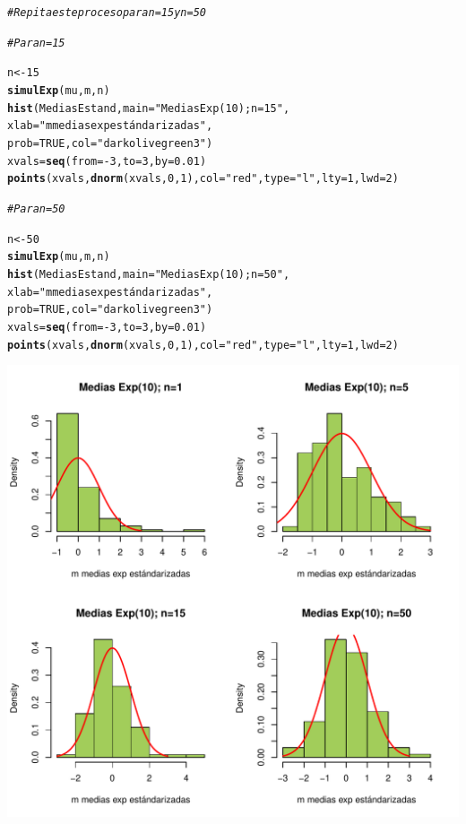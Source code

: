 \documentclass[12pt,letterpaper]{article}\usepackage[]{graphicx}\usepackage[]{color}
\makeatletter
\def\maxwidth{ %
  \ifdim\Gin@nat@width>\linewidth
    \linewidth
  \else
    \Gin@nat@width
  \fi
}
\newcommand{\hlnum}[1]{\textcolor[rgb]{0.686,0.059,0.569}{#1}}%
\newcommand{\hlstr}[1]{\textcolor[rgb]{0.192,0.494,0.8}{#1}}%
\newcommand{\hlcom}[1]{\textcolor[rgb]{0.678,0.584,0.686}{\textit{#1}}}%
\newcommand{\hlopt}[1]{\textcolor[rgb]{0,0,0}{#1}}%
\newcommand{\hlstd}[1]{\textcolor[rgb]{0.345,0.345,0.345}{#1}}%
\newcommand{\hlkwb}[1]{\textcolor[rgb]{0.69,0.353,0.396}{#1}}%
\newcommand{\hlkwc}[1]{\textcolor[rgb]{0.333,0.667,0.333}{#1}}%
\newcommand{\hlkwd}[1]{\textcolor[rgb]{0.737,0.353,0.396}{\textbf{#1}}}%
\newenvironment{kframe}{%
 \def\at@end@of@kframe{}%
 \ifinner\ifhmode%
  \def\at@end@of@kframe{\end{minipage}}%
  \begin{minipage}{\columnwidth}%
 \fi\fi%
 \def\FrameCommand##1{\hskip\@totalleftmargin \hskip-\fboxsep
 \colorbox{shadecolor}{##1}\hskip-\fboxsep
     \hskip-\linewidth \hskip-\@totalleftmargin \hskip\columnwidth}%
 \MakeFramed {\advance\hsize-\width
   \@totalleftmargin\z@ \linewidth\hsize
   \@setminipage}}%
 {\par\unskip\endMakeFramed%
 \at@end@of@kframe}
\newenvironment{knitrout}{}{} %
\makeatother
\begin{document}
\begin{enumerate}
\begin{knitrout}
\begin{kframe}
\begin{alltt}
\hlcom{# Repita este proceso para n=15 y n=50}

\hlcom{# Para n=15}

\hlstd{n} \hlkwb{<-} \hlnum{15}
\hlkwd{simulExp}\hlstd{(mu, m, n)}
\hlkwd{hist}\hlstd{(MediasEstand,} \hlkwc{main}\hlstd{=}\hlstr{"Medias Exp(10); n=15"}\hlstd{,}
     \hlkwc{xlab}\hlstd{=}\hlstr{"m medias exp estándarizadas"}\hlstd{,}
\hlkwc{prob}\hlstd{=}\hlnum{TRUE}\hlstd{,} \hlkwc{col}\hlstd{=}\hlstr{"darkolivegreen3"}\hlstd{)}
\hlstd{xvals} \hlkwb{=} \hlkwd{seq}\hlstd{(}\hlkwc{from}\hlstd{=}\hlopt{-}\hlnum{3}\hlstd{,} \hlkwc{to}\hlstd{=}\hlnum{3}\hlstd{,} \hlkwc{by}\hlstd{=}\hlnum{0.01}\hlstd{)}
\hlkwd{points}\hlstd{(xvals,} \hlkwd{dnorm}\hlstd{(xvals,} \hlnum{0}\hlstd{,} \hlnum{1}\hlstd{),} \hlkwc{col} \hlstd{=} \hlstr{"red"}\hlstd{,} \hlkwc{type}\hlstd{=}\hlstr{"l"}\hlstd{,} \hlkwc{lty}\hlstd{=}\hlnum{1}\hlstd{,} \hlkwc{lwd}\hlstd{=}\hlnum{2}\hlstd{)}

\hlcom{# Para n=50}

\hlstd{n} \hlkwb{<-} \hlnum{50}
\hlkwd{simulExp}\hlstd{(mu, m, n)}
\hlkwd{hist}\hlstd{(MediasEstand,} \hlkwc{main}\hlstd{=}\hlstr{"Medias Exp(10); n=50"}\hlstd{,}
     \hlkwc{xlab}\hlstd{=}\hlstr{"m medias exp estándarizadas"}\hlstd{,}
\hlkwc{prob}\hlstd{=}\hlnum{TRUE}\hlstd{,} \hlkwc{col}\hlstd{=}\hlstr{"darkolivegreen3"}\hlstd{)}
\hlstd{xvals} \hlkwb{=} \hlkwd{seq}\hlstd{(}\hlkwc{from}\hlstd{=}\hlopt{-}\hlnum{3}\hlstd{,} \hlkwc{to}\hlstd{=}\hlnum{3}\hlstd{,} \hlkwc{by}\hlstd{=}\hlnum{0.01}\hlstd{)}
\hlkwd{points}\hlstd{(xvals,} \hlkwd{dnorm}\hlstd{(xvals,} \hlnum{0}\hlstd{,} \hlnum{1}\hlstd{),} \hlkwc{col} \hlstd{=} \hlstr{"red"}\hlstd{,} \hlkwc{type}\hlstd{=}\hlstr{"l"}\hlstd{,} \hlkwc{lty}\hlstd{=}\hlnum{1}\hlstd{,} \hlkwc{lwd}\hlstd{=}\hlnum{2}\hlstd{)}
\end{alltt}
\end{kframe}
\includegraphics[width=\maxwidth]{figure/unnamed-chunk-6-1} 


\end{knitrout}
\end{enumerate}
\end{document}
